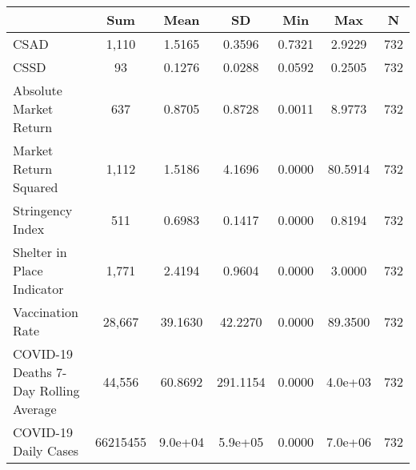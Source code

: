 {
\def\sym#1{\ifmmode^{#1}\else\(^{#1}\)\fi}
\begin{tabular}{l*{1}{cccccc}}
\toprule
                    &         Sum&        Mean&          SD&         Min&         Max&           N\\
\midrule
CSAD                &       1,110&      1.5165&      0.3596&      0.7321&      2.9229&         732\\
CSSD                &          93&      0.1276&      0.0288&      0.0592&      0.2505&         732\\
Absolute Market Return&         637&      0.8705&      0.8728&      0.0011&      8.9773&         732\\
Market Return Squared&       1,112&      1.5186&      4.1696&      0.0000&     80.5914&         732\\
Stringency Index    &         511&      0.6983&      0.1417&      0.0000&      0.8194&         732\\
Shelter in Place Indicator&       1,771&      2.4194&      0.9604&      0.0000&      3.0000&         732\\
Vaccination Rate    &      28,667&     39.1630&     42.2270&      0.0000&     89.3500&         732\\
COVID-19 Deaths 7-Day Rolling Average&      44,556&     60.8692&    291.1154&      0.0000&     4.0e+03&         732\\
COVID-19 Daily Cases&    66215455&     9.0e+04&     5.9e+05&      0.0000&     7.0e+06&         732\\
\bottomrule
\end{tabular}
}

